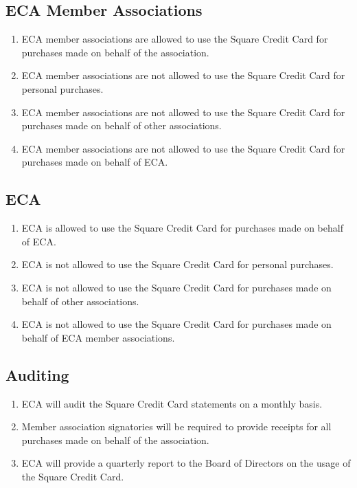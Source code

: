 \documentclass[11pt]{article}
\begin{document}
    \subsection{ECA Member Associations}\label{subsec:eca-member-associations}
    \begin{enumerate}
        \begin{enumerate}
            \item ECA member associations are allowed to use the Square Credit Card for purchases made on behalf of the association.
            \item ECA member associations are not allowed to use the Square Credit Card for personal purchases.
            \item ECA member associations are not allowed to use the Square Credit Card for purchases made on behalf of other associations.
            \item ECA member associations are not allowed to use the Square Credit Card for purchases made on behalf of ECA.
        \end{enumerate}
    \end{enumerate}

    \subsection{ECA}\label{subsec:eca}
    \begin{enumerate}
        \begin{enumerate}
            \item ECA is allowed to use the Square Credit Card for purchases made on behalf of ECA\@.
            \item ECA is not allowed to use the Square Credit Card for personal purchases.
            \item ECA is not allowed to use the Square Credit Card for purchases made on behalf of other associations.
            \item ECA is not allowed to use the Square Credit Card for purchases made on behalf of ECA member associations.
        \end{enumerate}
    \end{enumerate}

    \subsection{Auditing}\label{subsec:auditing}
    \begin{enumerate}
        \begin{enumerate}
            \item ECA will audit the Square Credit Card statements on a monthly basis.
            \item Member association signatories will be required to provide receipts for all purchases made on behalf of the association.
            \item ECA will provide a quarterly report to the Board of Directors on the usage of the Square Credit Card.
        \end{enumerate}
    \end{enumerate}
\end{document}
